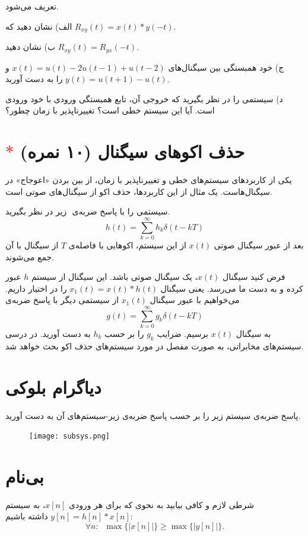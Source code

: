 \documentclass[a4paper]{article}
\begin{document}
	تعریف می‌شود. 
	
	الف) نشان دهید که  
	$R_{xy}(t) = x(t) * y(-t)$.
	
	ب)  نشان دهید
	$R_{xy}(t) = R_{yx}(-t)$.
	
	
	ج) خود همبستگی بین سیگنال‌های 
	$x(t) = u(t) - 2u(t-1) + u(t-2)$
	و
	$y(t) = u(t+1) - u(t)$
	را به دست آورید.
	
	د) سیستمی را در نظر بگیرید که  خروجی آن، تابع همبستگی ورودی  با خود ورودی است. آیا این سیستم خطی است؟ تغییرناپذیر با زمان چطور؟
	
	\section{
		\textcolor{red}{$\ast$}
		حذف اکو‌های سیگنال (۱۰ نمره)
	}
	یکی از کاربرد‌های سیستم‌های خطی و تغییرناپذیر با زمان، از بین بردن «اعوجاج» در سیگنال‌هاست. یک مثال از این کاربرد‌ها، حذف اکو‌ از سیگنال‌های صوتی است. 
	
	سیستمی را با پاسخ‌ ضربه‌ی ‌ زیر در نظر بگیرید.
	$$h(t) = \sum_{k = 0}^{\infty}h_k \delta(t-kT)$$
	بعد از عبور سیگنال صوتی 
	$x(t)$
	از این سیستم، اکو‌هایی با فاصله‌ی $T$ از سیگنال با آن جمع می‌شوند.
	
	فرض کنید سیگنال 
	$x(t)$،
	یک سیگنال صوتی باشد. این سیگنال  از سیستم $h$ عبور کرده و به دست ما می‌رسد. یعنی سیگنال
	$x_1(t) = x(t)*h(t)$
	را در اختیار داریم. می‌خواهیم با عبور سیگنال
	$x_1(t)$
	از سیستمی دیگر با پاسخ ضربه‌ی 
	$$g(t) = \sum_{k = 0}^{\infty}g_k \delta(t-kT)$$
	به سیگنال 
	$x(t)$
	برسیم. ضرایب 
	$g_k$
	را بر حسب
	$h_k$
	به دست آورید. در درسی سیستم‌های مخابراتی، به صورت مفصل در مورد سیستم‌های حذف اکو بحث خواهد شد.
	\section{دیاگرام بلوکی}
	پاسخ ضربه‌ی سیستم زیر را بر حسب پاسخ ضربه‌ی زیر-سیستم‌های آن به دست آورید.
	\begin{figure}[h!]
		\centering
		\texttt{[image: subsys.png]}
	\end{figure}
	
	\section{بی‌نام}
	شرطی لازم و کافی بیابید به نحوی که برای هر ورودی 
	$x[n]$،
	به سیستم 
	$y[n] = h[n] * x[n]$
	داشته باشیم:
	$$\forall n: \;\; \max\{|x[n]|\}\geq\max\{|y[n]|\}.$$
	\newpage
\end{document}
